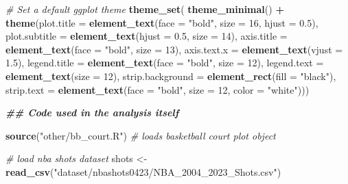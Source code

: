 \documentclass[
  12pt,
  a4paper,
]{article}
\newenvironment{Shaded}{\begin{snugshade}}{\end{snugshade}}
\newcommand{\AttributeTok}[1]{\textcolor[rgb]{0.13,0.29,0.53}{#1}}
\newcommand{\CommentTok}[1]{\textcolor[rgb]{0.56,0.35,0.01}{\textit{#1}}}
\newcommand{\DecValTok}[1]{\textcolor[rgb]{0.00,0.00,0.81}{#1}}
\newcommand{\DocumentationTok}[1]{\textcolor[rgb]{0.56,0.35,0.01}{\textbf{\textit{#1}}}}
\newcommand{\FloatTok}[1]{\textcolor[rgb]{0.00,0.00,0.81}{#1}}
\newcommand{\FunctionTok}[1]{\textcolor[rgb]{0.13,0.29,0.53}{\textbf{#1}}}
\newcommand{\NormalTok}[1]{#1}
\newcommand{\OtherTok}[1]{\textcolor[rgb]{0.56,0.35,0.01}{#1}}
\newcommand{\SpecialCharTok}[1]{\textcolor[rgb]{0.81,0.36,0.00}{\textbf{#1}}}
\newcommand{\StringTok}[1]{\textcolor[rgb]{0.31,0.60,0.02}{#1}}
\begin{document}
\begin{Shaded}
\begin{Highlighting}[]
\CommentTok{\# Set a default ggplot theme}
\FunctionTok{theme\_set}\NormalTok{(}
  \FunctionTok{theme\_minimal}\NormalTok{() }\SpecialCharTok{+}
  \FunctionTok{theme}\NormalTok{(}\AttributeTok{plot.title =} \FunctionTok{element\_text}\NormalTok{(}\AttributeTok{face =} \StringTok{"bold"}\NormalTok{, }\AttributeTok{size =} \DecValTok{16}\NormalTok{,}
                                  \AttributeTok{hjust =} \FloatTok{0.5}\NormalTok{),}
        \AttributeTok{plot.subtitle =} \FunctionTok{element\_text}\NormalTok{(}\AttributeTok{hjust =} \FloatTok{0.5}\NormalTok{, }\AttributeTok{size =} \DecValTok{14}\NormalTok{),}
        \AttributeTok{axis.title =} \FunctionTok{element\_text}\NormalTok{(}\AttributeTok{face =} \StringTok{"bold"}\NormalTok{, }\AttributeTok{size =} \DecValTok{13}\NormalTok{),}
        \AttributeTok{axis.text.x =} \FunctionTok{element\_text}\NormalTok{(}\AttributeTok{vjust =} \FloatTok{1.5}\NormalTok{),}
        \AttributeTok{legend.title =} \FunctionTok{element\_text}\NormalTok{(}\AttributeTok{face =} \StringTok{"bold"}\NormalTok{, }\AttributeTok{size =} \DecValTok{12}\NormalTok{),}
        \AttributeTok{legend.text =} \FunctionTok{element\_text}\NormalTok{(}\AttributeTok{size =} \DecValTok{12}\NormalTok{),}
        \AttributeTok{strip.background =} \FunctionTok{element\_rect}\NormalTok{(}\AttributeTok{fill =} \StringTok{"black"}\NormalTok{),}
        \AttributeTok{strip.text =} \FunctionTok{element\_text}\NormalTok{(}\AttributeTok{face =} \StringTok{"bold"}\NormalTok{, }\AttributeTok{size =} \DecValTok{12}\NormalTok{,}
                                  \AttributeTok{color =} \StringTok{"white"}\NormalTok{)))}

\DocumentationTok{\#\# Code used in the analysis itself}

\FunctionTok{source}\NormalTok{(}\StringTok{"other/bb\_court.R"}\NormalTok{) }\CommentTok{\# loads basketball court plot object}

\CommentTok{\# load nba shots dataset}
\NormalTok{shots }\OtherTok{\textless{}{-}} \FunctionTok{read\_csv}\NormalTok{(}\StringTok{"dataset/nbashots0423/NBA\_2004\_2023\_Shots.csv"}\NormalTok{)}


\end{Highlighting}
\end{Shaded}
\end{document}

